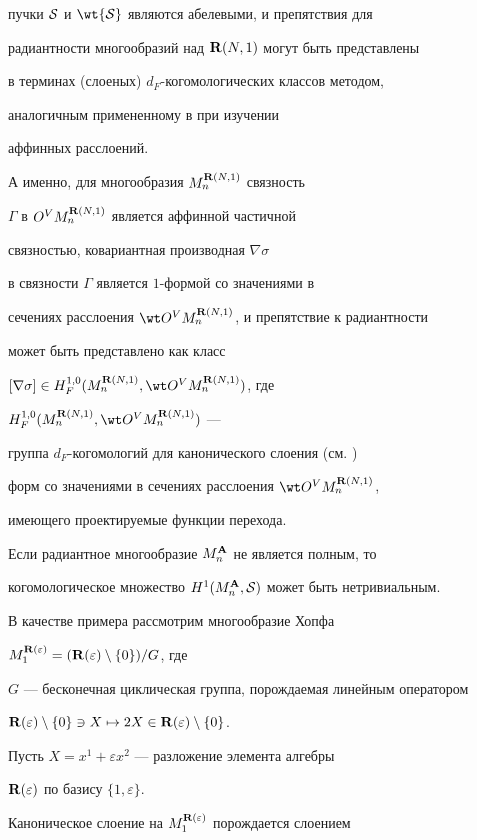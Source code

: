 пучки $\cal S$ и $\wt{\cal S}$ являются абелевыми, и препятствия для


радиантности многообразий над ${\bold R}(N,1)$ могут быть представлены


в терминах (слоеных) $d_F$-когомологических классов методом,


аналогичным примененному в \cite{G-H} при изучении


аффинных расслоений.


А именно, для многообразия $M^{{\bold R}(N,1)}_n$ связность


$\Gamma$ в $O^VM^{{\bold R}(N,1)}_n$ является аффинной частичной


\cite{Kam-T} связностью,  ковариантная производная $\nabla\sigma$


в связности $\Gamma$ является $1$-формой со значениями в


сечениях расслоения  $\wt O^VM^{\R(N,1)}_n$, и препятствие к радиантности


может быть представлено как класс


$[\nabla\sigma]\in H^{1,0}_F(M^{\R(N,1)}_n,\wt O^VM^{\R(N,1)}_n)$, где


$H^{1,0}_F(M^{\R(N,1)}_n,\wt O^VM^{\R(N,1)}_n)$ ---


группа $d_F$-когомологий для канонического слоения (см. \cite{Mol})


форм со значениями в сечениях расслоения $\wt O^VM^{\R(N,1)}_n$,


имеющего проектируемые функции перехода.





Если радиантное многообразие $M^{\bold A}_n$ не является полным, то


когомологическое множество $H^1(M^{\bold A}_n,{\cal S})$ может быть нетривиальным.


В качестве примера рассмотрим многообразие Хопфа


$M_1^{{\bold R}(\varepsilon)}=({\bold R}(\varepsilon)\setminus\{0\})/G$, где


$G$ --- бесконечная циклическая группа, порождаемая линейным оператором


$\R(\varepsilon)\setminus\{0\}\ni X\mapsto 2X\in


\R(\varepsilon)\setminus\{0\}$.


Пусть $X=x^1+\varepsilon x^2$ --- разложение элемента алгебры


${\bold R}(\varepsilon)$ по базису $\{1,\varepsilon\}$.


Каноническое слоение на $M_1^{{\bold R}(\varepsilon)}$ порождается слоением


